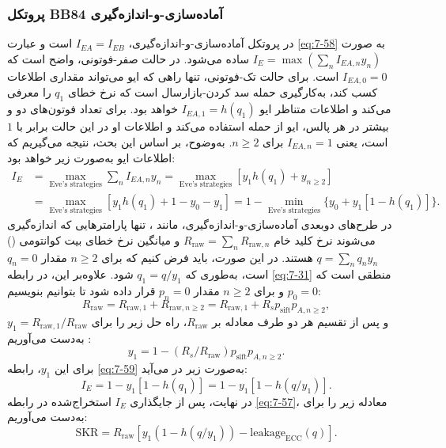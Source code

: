 \subsubsection{پروتکل BB84 آماده‌سازی-و-اندازه‌گیری}
\label{subsec:7-4-3-1}
در پروتکل  آماده‌سازی-و-اندازه‌گیری، $I_{EA} = I_{EB}$ است و عبارت \eqref{eq:7-58} به صورت $I_E = \max (\sum_{n} I_{EA,n} y_n)$ ساده می‌شود. در حالت صفر-فوتونی، واضح است که $I_{EA,0} = 0$ است. برای حالت تک-فوتونی، تنها راهی که ایو می‌تواند مقداری اطلاعات کسب کند، به‌کارگیری حمله سد کردن-بازارسال است که نرخ خطای $q_1$ را معرفی می‌کند و اطلاعات متناظر ایو $I_{EA,1} = h(q_1)$ خواهد بود. برای تعداد فوتون‌های دو و بیشتر در هر پالس، ایو از حمله  استفاده می‌کند و اطلاعات او در این حالت برابر با $1$ است، یعنی $I_{EA,n} = 1$ برای $n \geq 2$. به‌وضوح، بر اساس این بحث، نتیجه می‌گیریم که اطلاعات ایو به‌صورت زیر خواهد بود:
\begin{equation}
	\begin{aligned}
		I_E &= \max_{\text{Eve's strategies}} \sum_{n} I_{EA,n} y_n = \max_{\text{Eve's strategies}} [y_1 h(q_1) + y_{n \geq 2}] \\
		&= \max_{\text{Eve's strategies}} [y_1 h(q_1) + 1 - y_0 - y_1] = 1 - \min_{\text{Eve's strategies}} \{ y_0 + y_1 [1 - h(q_1)] \}.
	\end{aligned}
	\label{eq:7-59}
\end{equation}
در طرح‌های  دوبعدی آماده‌سازی-و-اندازه‌گیری، مانند ، تنها پارامترهایی که اندازه‌گیری می‌شوند نرخ کلید خام $R_{\text{raw}} = \sum_n R_{\text{raw},n}$ و میانگین نرخ خطای بیت کوانتومی () $q = \sum_n q_n y_n$ هستند. در این صورت، باید فرض کنیم که برای $n \geq 2$ مقدار $q_n = 0$ است، به‌طوری که $q_1 = q/y_1$ شود. علاوه‌بر این، در رابطه \eqref{eq:7-31} منطقی است که $p_0 = 0$ و برای $n \geq 2$ مقدار $p_n = 0$ قرار داده شود تا بتوانیم بنویسیم:
\begin{equation}
	R_{\text{raw}} = R_{\text{raw},1} + R_{\text{raw},n \geq 2} = R_{\text{raw},1} + R_s p_{\text{sift}} p_{A,n \geq 2},
	\label{eq:7-60}
\end{equation}
و پس از تقسیم هر دو طرف معادله بر $R_{\text{raw}}$، راه حل زیر را برای $y_1 = R_{\text{raw},1}/R_{\text{raw}}$ به‌دست می‌آوریم \cite{7-68}:
\begin{equation}
	y_1 = 1 - (R_s/R_{\text{raw}}) p_{\text{sift}} p_{A,n \geq 2}.
	\label{eq:7-61}
\end{equation}
برای این $y_1$، رابطه \eqref{eq:7-59} به‌صورت زیر در می‌آید:
\begin{equation}
	I_E = 1 - y_1 [1 - h(q_1)] = 1 - y_1 [1 - h(q/y_1)].
	\label{eq:7-62}
\end{equation}
در نهایت، پس از جایگذاری $I_E$ استخراج‌شده در رابطه \eqref{eq:7-57}، معادله زیر را برای  به‌دست می‌آوریم:
\begin{equation}
	\text{SKR} = R_{\text{raw}} [y_1 (1 - h(q/y_1)) - \text{leakage}_{\text{ECC}}(q)].
	\label{eq:7-63}
\end{equation}

